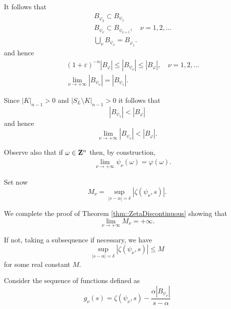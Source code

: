 \documentclass[12pt,a4paper]{amsart}
\begin{document}
{It follows that
\begin{eqnarray}
&&{B}_{{\varphi}_{2}}{\subset}{B}_{{\psi}_{1}}
\nonumber\\
&&{B}_{{\psi}_{\nu}}{\subset}{B}_{{\psi}_{{\nu}+1}},
\quad{\nu}=1,2,\ldots
\nonumber\\
&&\bigcup_{\nu}{B}_{{\psi}_{\nu}}={B}_{{{\varphi}_{1}}}.
\nonumber
\end{eqnarray}
and hence
\begin{eqnarray}
	&&(1+{\varepsilon})^{-{n}}|{B}_{\varphi}|\leq
	|{B}_{{\psi}_{\nu}}|\leq|{B}_{\varphi}|,
	\quad{\nu}=1,2,\ldots
	\nonumber\\
	&&\lim_{{\nu}\to+\infty}|{B}_{{\psi}_{\nu}}|=
	|{B}_{{\psi}_1}|.
	\nonumber
\end{eqnarray}

Since ${\left|{K}\right|_{{n}-1}}>0$
and ${\left|{{{S_{L}}\setminus{K}}}\right|_{{n}-1}}>0$
it follows that
\begin{equation}\nonumber
|{B}_{{\psi}_1}|<|{B}_{\varphi}|
\end{equation}
and hence
\begin{equation}\label{eq::proof::Inequality}
\lim_{{\nu}\to+\infty}|{B}_{{\psi}_{\nu}}|
<|{B}_{\varphi}|.
\end{equation}

Observe also that if ${\omega}\in{{\bf Z}}^{n}$ then,
by construction,
\begin{eqnarray}\label{eq::proof::IntegerConvergence}
&&\lim_{{\nu}\to+\infty}{\psi}_{\nu}({\omega})
={\varphi}({\omega}).
\end{eqnarray}

Set now
\begin{equation}\nonumber
	{M}_{\nu}=
	\sup_{|{s}-{\alpha}|=\delta}
	\left|{\zeta}({\psi}_{\nu},{s})\right|.
\end{equation}

We complete the proof of Theorem \ref{thm::ZetaDiscontinuous}
showing that
\begin{equation}\nonumber
	\lim_{{\nu}\to+\infty}{M}_{\nu}=+\infty.
\end{equation}

If not, taking a subsequence if necessary, we have
\begin{equation}\nonumber
	\sup_{|{s}-{\alpha}|=\delta}
	\left|{\zeta}({\psi}_{\nu},{s})\right|
	\leq{M}
\end{equation}
for some real constant ${M}$.

Consider the sequence of functions defined as
\begin{equation}
	g_{\nu}({s})={\zeta}({\psi}_{\nu},{s})
		-\frac{{\alpha}|{B}_{{\psi}_{\nu}}|}{{s}-{\alpha}}
\end{equation}

}
\end{document}
